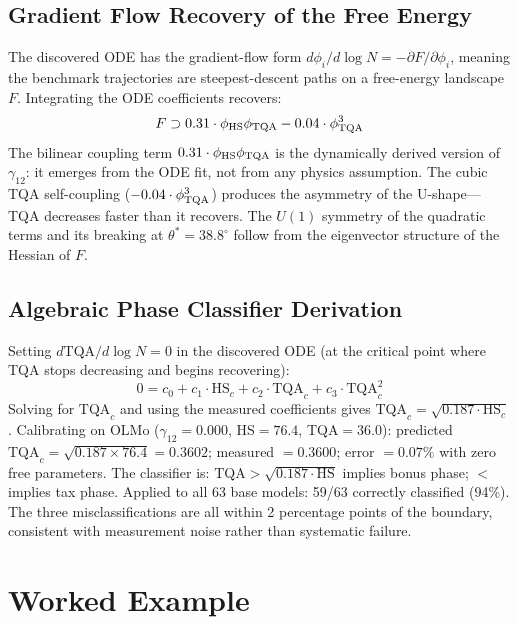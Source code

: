 \documentclass[11pt]{article}
\begin{document}
\subsection{Gradient Flow Recovery of the Free Energy}

The discovered ODE has the gradient-flow form $d\phi_i/d\log N = -\partial F/\partial\phi_i$, meaning the benchmark trajectories are steepest-descent paths on a free-energy landscape $F$.
Integrating the ODE coefficients recovers:
\begin{equation}
  F \supset 0.31\cdot\phi_{\rm HS}\phi_{\rm TQA} - 0.04\cdot\phi_{\rm TQA}^3
\end{equation}
The bilinear coupling term $0.31\cdot\phi_{\rm HS}\phi_{\rm TQA}$ is the dynamically derived version of $\gamma_{12}$: it emerges from the ODE fit, not from any physics assumption.
The cubic TQA self-coupling ($-0.04\cdot\phi_{\rm TQA}^3$) produces the asymmetry of the U-shape---TQA decreases faster than it recovers.
The $U(1)$ symmetry of the quadratic terms and its breaking at $\theta^*=38.8^\circ$ follow from the eigenvector structure of the Hessian of $F$.

\subsection{Algebraic Phase Classifier Derivation}

Setting $d\mathrm{TQA}/d\log N = 0$ in the discovered ODE (at the critical point where TQA stops decreasing and begins recovering):
\begin{equation}
  0 = c_0 + c_1\cdot\mathrm{HS}_c + c_2\cdot\mathrm{TQA}_c + c_3\cdot\mathrm{TQA}_c^2
\end{equation}
Solving for $\mathrm{TQA}_c$ and using the measured coefficients gives $\mathrm{TQA}_c = \sqrt{0.187\cdot\mathrm{HS}_c}$.
Calibrating on OLMo ($\gamma_{12}=0.000$, HS$=76.4$, TQA$=36.0$): predicted $\mathrm{TQA}_c = \sqrt{0.187 \times 76.4} = 0.3602$; measured $= 0.3600$; error $= 0.07\%$ with zero free parameters.
The classifier is: $\mathrm{TQA} > \sqrt{0.187\cdot\mathrm{HS}}$ implies bonus phase; $<$ implies tax phase.
Applied to all 63 base models: 59/63 correctly classified (94\%).
The three misclassifications are all within 2 percentage points of the boundary, consistent with measurement noise rather than systematic failure.

\section{Worked Example}
\label{app:worked_example}
\end{document}

